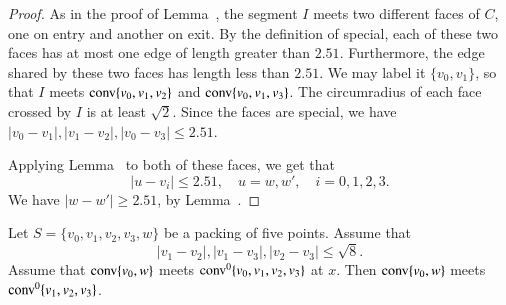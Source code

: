 \begin{tarskidata}
\begin{tarski}
\begin{proof} As in the proof of Lemma~,
the segment $I$ meets
two different faces of $C$, one on entry and another on exit.
By the definition of special, each of these two faces has at most
one edge of length greater than $2.51$.  Furthermore, the edge
shared by these two faces has length less than $2.51$.  We may
label it $\{v_0,v_1\}$, so that $I$ meets ${\operatorname{conv}}\{v_0,v_1,v_2\}$
and ${\operatorname{conv}}\{v_0,v_1,v_3\}$.   The circumradius
of each face crossed by $I$ is at least $\sqrt2$.
Since the faces are special,
we have $|v_0-v_1|,|v_1-v_2|,|v_0-v_3|\le 2.51$.  

Applying Lemma~
to both of these faces, we get that 
   $$
   |u-v_i|\le 2.51,\quad u=w,w',\quad i=0,1,2,3.
   $$
We have $|w-w'|\ge 2.51$, by Lemma~.\FIXX{$\CalE$}
%
%
\end{proof}
\end{tarski}





\begin{tarski}

\begin{lemma}
Let $S=\{v_0,v_1,v_2,v_3,w\}$ be a packing of five points.
Assume that 
  $$
  |v_1-v_2|,|v_1-v_3|,|v_2-v_3|\le\sqrt8.
  $$
Assume that ${\operatorname{conv}}\{v_0,w\}$ meets ${\operatorname{conv}}^0\{v_0,v_1,v_2,v_3\}$ at $x$.
Then ${\operatorname{conv}}\{v_0,w\}$ meets ${\operatorname{conv}}^0\{v_1,v_2,v_3\}$.
\end{lemma}


\end{tarski}
\end{tarskidata}
